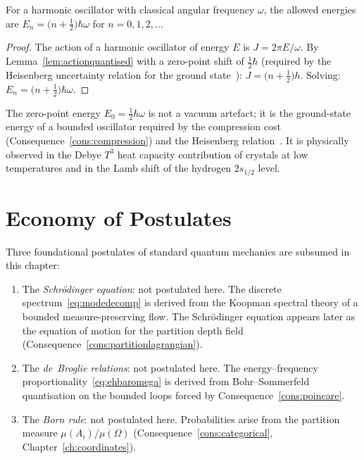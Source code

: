 \begin{corollary}
\label{cor:harmonic}
For a harmonic oscillator with classical angular frequency $\omega$, the
allowed energies are $E_{n}=\bigl(n+\tfrac{1}{2}\bigr)\hbar\omega$
for $n=0,1,2,\ldots$
\end{corollary}

\begin{proof}
The action of a harmonic oscillator of energy $E$ is $J=2\pi E/\omega$.
By Lemma~\ref{lem:actionquantised} with a zero-point shift of
$\tfrac{1}{2}\hbar$ (required by the Heisenberg uncertainty relation for
the ground state~\citep{heisenberg1927}): $J=\bigl(n+\tfrac{1}{2}\bigr)h$.
Solving: $E_{n}=\bigl(n+\tfrac{1}{2}\bigr)\hbar\omega$.
\end{proof}

\begin{remark}
The zero-point energy $E_{0}=\tfrac{1}{2}\hbar\omega$ is not a vacuum
artefact; it is the ground-state energy of a bounded oscillator required
by the compression cost (Consequence~\ref{cons:compression}) and the
Heisenberg relation~\citep{heisenberg1927}.
It is physically observed in the Debye $T^{3}$ heat capacity contribution
of crystals at low temperatures and in the Lamb shift of the hydrogen
$2s_{1/2}$ level.
\end{remark}

\section{Economy of Postulates}
\label{sec:ch3-economy}

Three foundational postulates of standard quantum mechanics are subsumed
in this chapter:
\begin{enumerate}
  \item The \emph{Schrödinger equation}: not postulated here.
    The discrete spectrum~\eqref{eq:modedecomp} is derived from the
    Koopman spectral theory of a bounded measure-preserving flow.
    The Schrödinger equation appears later as the equation of motion for
    the partition depth field (Consequence~\ref{cons:partitionlagrangian}).
  \item The \emph{de~Broglie relations}: not postulated here.
    The energy--frequency proportionality~\eqref{eq:ehbaromega} is
    derived from Bohr--Sommerfeld quantisation on the bounded loops
    forced by Consequence~\ref{cons:poincare}.
  \item The \emph{Born rule}: not postulated here.
    Probabilities arise from the partition measure $\mu(A_{i})/\mu(\Omega)$
    (Consequence~\ref{cons:categorical}, Chapter~\ref{ch:coordinates}).
\end{enumerate}

